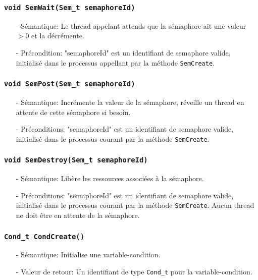 \documentclass[11pt]{article}
\theoremstyle{definition}
\theoremstyle{definition}
\begin{document}
\subsubsection{\texttt{void SemWait(Sem\_t semaphoreId)}}
\begin{itemize}
\item[-]Sémantique: Le thread appelant attends que la sémaphore ait une valeur $>0$ et la décrémente. 
\item[-]Précondition: "semaphoreId" est un identifiant de semaphore valide, initialisé dans le processus
  appellant par la méthode \texttt{SemCreate}.
\end{itemize}

\subsubsection{\texttt{void SemPost(Sem\_t semaphoreId)}}
\begin{itemize}
\item[-]Sémantique: Incrémente la valeur de la sémaphore, réveille un thread en attente de cette sémaphore
  si besoin.
\item[-]Préconditions: "semaphoreId" est un identifiant de semaphore valide, initialisé dans le processus
  courant par la méthode \texttt{SemCreate}.
\end{itemize}

\subsubsection{\texttt{void SemDestroy(Sem\_t semaphoreId)}}
\begin{itemize}
\item[-]Sémantique: Libère les ressources associées à la sémaphore.
\item[-]Préconditions: "semaphoreId" est un identifiant de semaphore valide, initialisé dans le processus
  courant par la méthode \texttt{SemCreate}. Aucun thread ne doit être en attente de la sémaphore.
\end{itemize}

\subsubsection{\texttt{Cond\_t CondCreate()}}
\begin{itemize}
\item[-]Sémantique: Initialise une variable-condition.
\item[-]Valeur de retour: Un identifiant de type \texttt{Cond\_t} pour la variable-condition.
\end{itemize}
\end{document}
